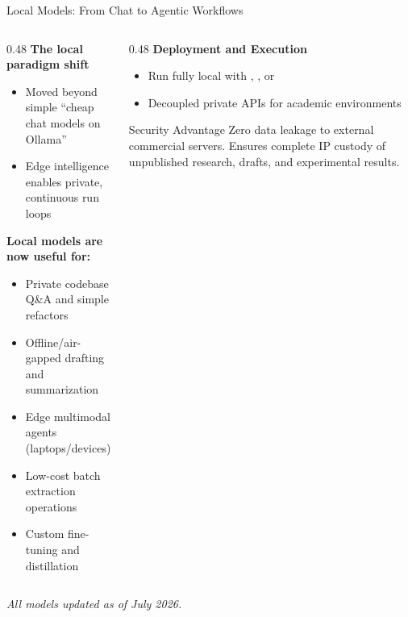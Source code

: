 \begin{frame}{Local Models: From Chat to Agentic Workflows}
  \begin{columns}[T, onlytextwidth]
    \begin{column}{0.48\textwidth}
      \textbf{The local paradigm shift}
      \begin{itemize}
        \item Moved beyond simple ``cheap chat models on Ollama''
        \item Edge intelligence enables private, continuous run loops
      \end{itemize}
      \vspace{0.4em}
      \textbf{Local models are now useful for:}
      \begin{itemize}
        \item Private codebase Q\&A and simple refactors
        \item Offline/air-gapped drafting and summarization
        \item Edge multimodal agents (laptops/devices)
        \item Low-cost batch extraction operations
        \item Custom fine-tuning and distillation 
      \end{itemize}
    \end{column}
    \hfill
    \begin{column}{0.48\textwidth}
      \textbf{Deployment and Execution}
      \begin{itemize}
        \item Run fully local with , , or 
        \item Decoupled private APIs for academic environments
      \end{itemize}
      \vspace{0.4em}
      \begin{block}{Security Advantage}
        Zero data leakage to external commercial servers. Ensures complete IP custody of unpublished research, drafts, and experimental results.
      \end{block}
    \end{column}
  \end{columns}
  \vspace{0.4em}
  \centering\tiny\textit{All models updated as of July 2026.}
\end{frame}

